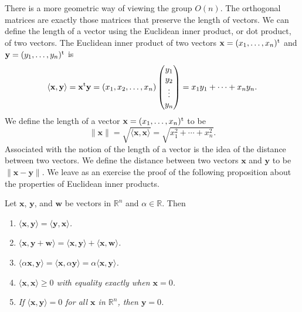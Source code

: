  
There is a more geometric way of viewing the group $O(n)$. The
orthogonal matrices are exactly those matrices that preserve the
length of vectors. We can define the length of a vector using the
{\bfi Euclidean inner product}, or
{\bfi dot product}, of two vectors. The Euclidean inner product of
two vectors ${\mathbf x}=(x_1, \ldots, x_n)^{\rm t}$ and ${\mathbf
y}=(y_1, \ldots, y_n)^{\rm t}$ is
\[
\langle  {\mathbf x}, {\mathbf y} \rangle
=
{\mathbf x}^{\rm t}  {\mathbf y}
=
(x_1, x_2, \ldots, x_n)
\begin{pmatrix}
y_1 \\ y_2 \\ \vdots \\ y_n
\end{pmatrix}
=
x_1 y_1 + \cdots + x_n y_n.
\]
We define the length of a vector ${\mathbf x}=(x_1, \ldots, x_n)^{\rm
t}$ to be 
\[
\| {\mathbf x} \|\label{notelengthvect} 
= \sqrt{\langle  {\mathbf x}, {\mathbf x} \rangle} 
= \sqrt{x_1^2 + \cdots + x_n^2}.
\]
Associated with the notion of the length of a vector is the idea of
the distance between two vectors. We define the {\bfi distance\/}
between two vectors ${\mathbf x}$ and ${\mathbf y}$ to be $\| {\mathbf
x}-{\mathbf y} \|$. We leave as an exercise the proof of the following
proposition about the properties of Euclidean inner products.  
 
 
\begin{proposition}
Let ${\mathbf x}$, ${\mathbf y}$, and ${\mathbf w}$ be vectors in ${\mathbb
R}^n$ and $\alpha \in {\mathbb R}$. Then 
\begin{enumerate}
 
\rm \item \it
$\langle {\mathbf x}, {\mathbf y} \rangle = \langle {\mathbf y}, {\mathbf x}
\rangle$. 
 
\rm \item \it
$\langle {\mathbf x}, {\mathbf y} + {\mathbf w} \rangle = \langle {\mathbf x},
{\mathbf y} \rangle + \langle {\mathbf x}, {\mathbf w} \rangle$.
 
\rm \item \it
$\langle \alpha {\mathbf x}, {\mathbf y} \rangle = \langle {\mathbf x},
\alpha {\mathbf y} \rangle = \alpha \langle  {\mathbf x}, {\mathbf y}
\rangle$. 
 
\rm \item \it
$\langle {\mathbf x}, {\mathbf x} \rangle \geq 0$ with equality exactly
when ${\mathbf x} = 0$. 
 
\rm \item \it
If $\langle {\mathbf x}, {\mathbf y} \rangle = 0$  for all ${\mathbf x}$ in
${\mathbb R}^n$, then ${\mathbf y} = 0$. 
 
\end{enumerate}
\end{proposition}
 
